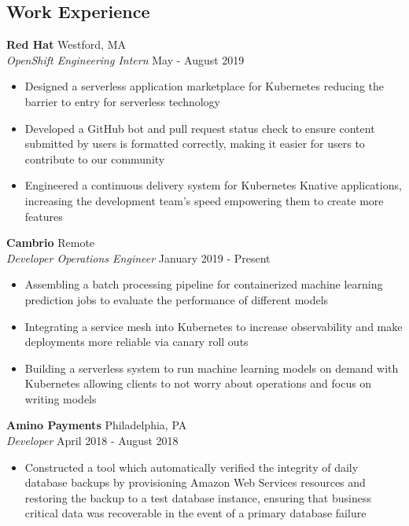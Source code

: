 \documentclass[10pt]{article}
\begin{document}
\begin{flushleft}
\section{Work Experience}
	\textbf{Red Hat} \hfill Westford, MA \\
	\textit{OpenShift Engineering Intern} \hfill May - August 2019 \\
	\begin{itemize}
       	\item Designed a serverless application marketplace for Kubernetes reducing the barrier to entry for serverless technology
		\item Developed a GitHub bot and pull request status check to ensure content submitted by users is formatted
               correctly, making it easier for users to contribute to our community
		\item Engineered a continuous delivery system for Kubernetes Knative applications, increasing the development
               team's speed empowering them to create more features
	\end{itemize}
     
	\textbf{Cambrio} \hfill Remote \\
	\textit{Developer Operations Engineer} \hfill January 2019 - Present \\
	\begin{itemize}
		\item Assembling a batch processing pipeline for containerized machine learning prediction jobs to evaluate the 
			performance of different models
		\item Integrating a service mesh into Kubernetes to increase observability and make deployments more reliable
			via canary roll outs
		\item Building a serverless system to run machine learning models on demand with Kubernetes allowing clients to not worry
			about operations and focus on writing models
	\end{itemize}

	\textbf{Amino Payments} \hfill Philadelphia, PA \\
	\textit{Developer} \hfill April 2018 - August 2018 \\
	\begin{itemize}
		\item Constructed a tool which automatically verified the integrity of daily database backups by provisioning
			Amazon Web Services resources and restoring the backup to a test database instance, ensuring that business 
			critical data was recoverable in the event of a primary database failure


\end{itemize}
\end{flushleft}
\end{document}
